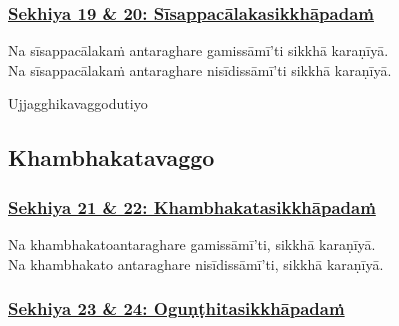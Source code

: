 \subsubsection*{\hyperref[training19-20]{Sekhiya 19 \& 20: Sīsappacālakasikkhāpadaṁ}}
\label{sekh19-20}

Na sīsappacālakaṁ antaraghare gamissāmī'ti sikkhā karaṇīyā.\\
Na sīsappacālakaṁ antaraghare nisīdissāmī'ti sikkhā karaṇīyā.

\begin{center}
	Ujjagghikavaggo\makeatletter\hyperlink{endnote476-appendix}\makeatother \thinspace dutiyo\makeatletter\hyperlink{endnote477-appendix}\makeatother \thinspace
\end{center}



\subsection{Khambhakatavaggo}

\subsubsection*{\hyperref[training21-22]{Sekhiya 21 \& 22: Khambhakatasikkhāpadaṁ}}
\label{sekh21-22}

Na khambhakato\makeatletter\hyperlink{endnote478-appendix}\makeatother \thinspace antaraghare gamissāmī'ti, sikkhā karaṇīyā.\\
Na khambhakato antaraghare nisīdissāmī'ti, sikkhā karaṇīyā.



\subsubsection*{\hyperref[training23-24]{Sekhiya 23 \& 24: Oguṇṭhitasikkhāpadaṁ}}
\label{sekh23-24}


